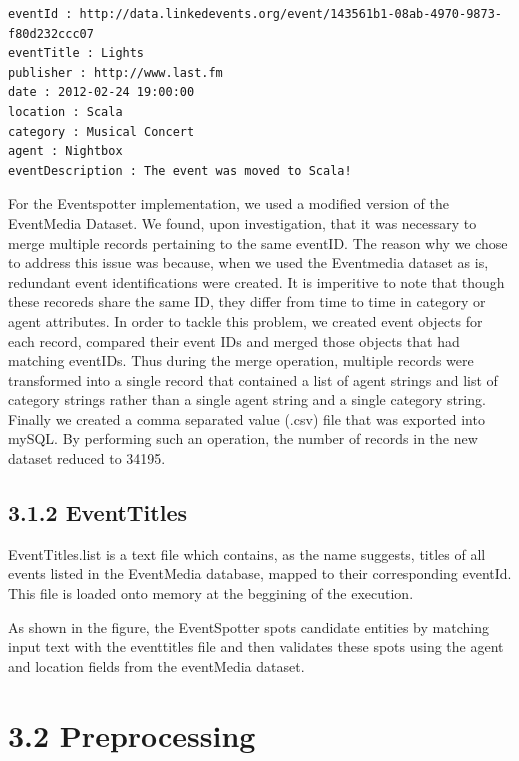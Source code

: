\documentclass[a4paper,11pt]{report}
\begin{document}
\begin{lstlisting}
eventId : http://data.linkedevents.org/event/143561b1-08ab-4970-9873-f80d232ccc07
eventTitle : Lights
publisher : http://www.last.fm
date : 2012-02-24 19:00:00
location : Scala
category : Musical Concert
agent : Nightbox
eventDescription : The event was moved to Scala!
\end{lstlisting}



For the Eventspotter implementation, we used a modified version of the EventMedia Dataset. We found, upon investigation, that it was necessary to merge multiple records pertaining to the same eventID. The reason why we chose to address this issue was because, when we used the Eventmedia dataset as is, redundant event identifications were created. It is imperitive to note that though these recoreds share the same ID, they differ from time to time in category or agent attributes. In order to tackle this problem, we created event objects for each record, compared their event IDs and merged those objects that had matching eventIDs. Thus during the merge operation, multiple records were transformed into a single record that contained a list of agent strings and list of category strings rather than a single agent string and a single category string. Finally we created a comma separated value (.csv) file that was exported into mySQL. By performing such an operation, the number of records in the new dataset reduced to 34195.   
 

\subsection*{3.1.2 EventTitles}
EventTitles.list is a text file which contains, as the name suggests, titles of all events listed in the EventMedia database, mapped to their corresponding eventId. This file is loaded onto memory at the beggining of the execution.

As shown in the figure, the EventSpotter spots candidate entities by matching input text with the eventtitles file and then validates these spots using the agent and location fields from the eventMedia dataset.

\section*{3.2 Preprocessing}
\end{document}
